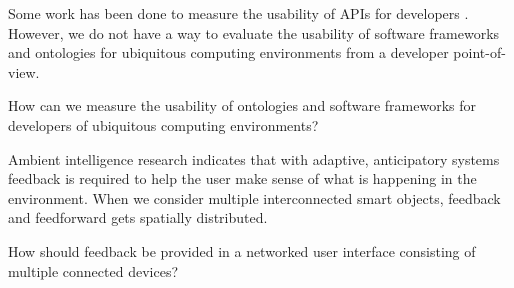 
Some work has been done to measure the usability of \acp{API} for developers \cite{Robillard2009}. However, we do not have a way to evaluate the usability of software frameworks and ontologies for ubiquitous computing environments from a developer point-of-view. 

How can we measure the usability of ontologies and software frameworks for developers of ubiquitous computing environments? 


Ambient intelligence research indicates that with adaptive, anticipatory systems feedback is required to help the user make sense of what is happening in the environment. When we consider multiple interconnected smart objects, feedback and feedforward gets spatially distributed. 

How should feedback be provided in a networked user interface consisting of multiple connected devices? 



	






